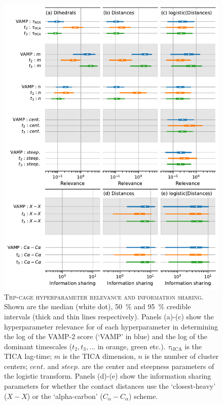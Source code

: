 \documentclass{article}
\begin{document}
\begin{figure}
    \centering
    \includegraphics[height=0.8\textheight]{figures/sensitivities/2jof_sensitivity.pdf}
    \caption{\textsc{Trp-cage hyperparameter relevance and information sharing}. Shown are the  median (white dot), \SI{50}{\percent} and \SI{95}{\percent} credible intervals (thick and thin lines respectively).  Panels (a)-(c) show the hyperparameter relevance for of each hyperparameter in determining the log of the VAMP-2 score (`VAMP' in blue) and the log of the dominant timescales ($t_{2}, t_{3}, ...$ in orange, green etc.). $\tau_{\mathrm{tICA}}$ is the TICA lag-time; $m$ is the TICA dimension, $n$ is the number of cluster centers; $cent.$ and $steep.$ are the center and steepness parameters of the logistic transform. Panels (d)-(e) show the information sharing parameters for whether the contact distances use the `closest-heavy' ($X-X$) or the `alpha-carbon' ($C_{\alpha}-C_{\alpha}$) scheme.  }
    \label{fig:2jof_sense}
\end{figure}
\end{document}
